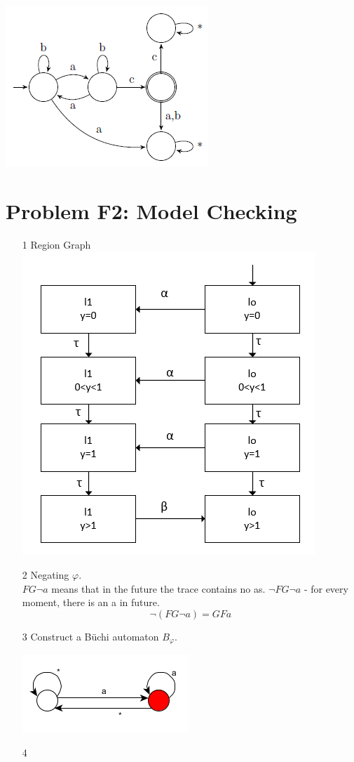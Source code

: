 \documentclass[]{article}
\begin{document}
\begin{itemize}
		
		\includegraphics[scale=1]{A3.PNG}
	\end{itemize}
	
	\maketitle
	\section{Problem F2: Model Checking}
	\begin{itemize}
		\item [1] Region Graph\\
		\includegraphics[scale=0.5]{RegionGraph.PNG}
		\item [2] Negating $\varphi$. \\
		$FG\neg{a}$ means that in the future the trace contains no as.
		$\neg{FG\neg{a}}$ - for every moment, there is an a in future.
		$$ \neg({FG\neg{a}}) = GFa$$
		\item [3] Construct a B\"uchi automaton $B_\varphi$.
		
		
		
		\includegraphics[scale=1]{p2.png}
		\item [4] 
	\end{itemize}
	
\end{document}
